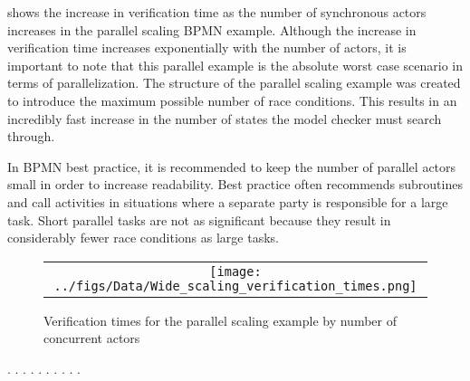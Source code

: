  shows the increase in verification time as the number of synchronous actors increases in the parallel scaling BPMN example. Although the increase in verification time increases exponentially with the number of actors, it is important to note that this parallel example is the absolute worst case scenario in terms of parallelization. The structure of the parallel scaling example was created to introduce the maximum possible number of race conditions. This results in an incredibly fast increase in the number of states the model checker must search through.

In BPMN best practice, it is recommended to keep the number of parallel actors small in order to increase readability. Best practice often recommends subroutines and call activities in situations where a separate party is responsible for a large task. Short parallel tasks are not as significant because they result in considerably fewer race conditions as large tasks.

\begin{figure*}[t]
  \begin{center}
    \begin{tabular}{c}
        \texttt{[image: ../figs/Data/Wide\_scaling\_verification\_times.png]}
    \end{tabular}
  \end{center}
\caption{Verification times for the parallel scaling example by number of concurrent actors}
\label{fig:wideScalingVerificationTimes}
\end{figure*}

.
.
.
.
.
.
.
.
.
.
